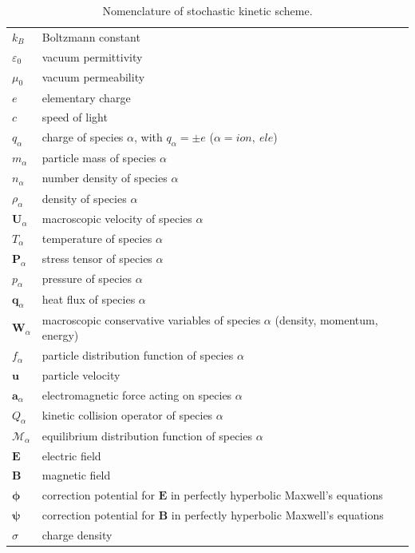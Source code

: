 \documentclass[preprint,3p,12pt,sort&compress]{elsarticle}
\begin{document}
\begin{table}
	\centering
	\caption{Nomenclature of stochastic kinetic scheme.}
	\begin{tabular*}{16cm}{lll}
		\hline
		$k_B$ & Boltzmann constant \\
		$\varepsilon_0$ & vacuum permittivity \\
		$\mu_0$ & vacuum permeability \\
		$e$ & elementary charge \\
		$c$ & speed of light   \\
		$q_\alpha$ & charge of species $\alpha$, with $q_\alpha=\pm e$ ($\alpha = ion,\ ele$) \\
		$m_\alpha$ & particle mass of species $\alpha$ \\
		$n_\alpha$ & number density of species $\alpha$ \\
		$\rho_\alpha$ & density of species $\alpha$ \\
		$\mathbf U_\alpha$ & macroscopic velocity of species $\alpha$ \\
		$T_\alpha$ & temperature of species $\alpha$ \\
		$\mathbf P_\alpha$ & stress tensor of species $\alpha$ \\
		$p_\alpha$ & pressure of species $\alpha$ \\
		$\mathbf q_\alpha$ & heat flux of species $\alpha$ \\
		$\mathbf W_\alpha$ & macroscopic conservative variables of species $\alpha$ (density, momentum, energy) \\
		$f_\alpha$ & particle distribution function of species $\alpha$  \\
		$\mathbf u$ & particle velocity \\
		$\mathbf a_\alpha$ & electromagnetic force acting on species $\alpha$ \\
		$Q_\alpha$ & kinetic collision operator of species $\alpha$ \\
		$\mathcal M_\alpha$ & equilibrium distribution function of species $\alpha$ \\
		$\mathbf E$ & electric field \\
		$\mathbf B$ & magnetic field \\
		$\mathbf \phi$ & correction potential for $\mathbf E$ in perfectly hyperbolic Maxwell's equations \\
		$\mathbf \psi$ & correction potential for $\mathbf B$ in perfectly hyperbolic Maxwell's equations \\
		$\sigma$ & charge density \\

\end{tabular*}
\end{table}
\end{document}

